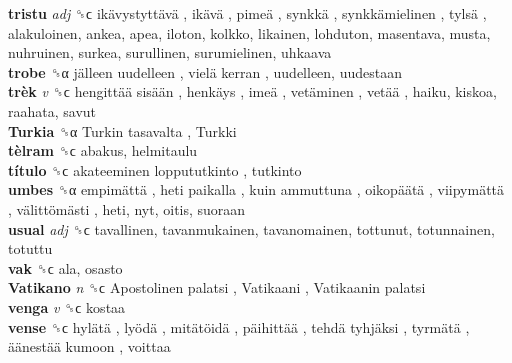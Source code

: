 \textbf{tristu} \emph{adj}  ␝ϲ   ikävystyttävä ,  ikävä ,  pimeä ,  synkkä ,  synkkämielinen ,  tylsä , alakuloinen, ankea, apea, iloton, kolkko, likainen, lohduton, masentava, musta, nuhruinen, surkea, surullinen, surumielinen, uhkaava  \\
\textbf{trobe} ␝α   jälleen uudelleen ,  vielä kerran , uudelleen, uudestaan  \\
\textbf{trèk} \emph{v}  ␝ϲ   hengittää sisään ,  henkäys ,  imeä ,  vetäminen ,  vetää , haiku, kiskoa, raahata, savut  \\
\textbf{Turkia} ␝α   Turkin tasavalta ,  Turkki   \\
\textbf{tèlram} ␝ϲ  abakus, helmitaulu  \\
\textbf{título} ␝ϲ   akateeminen loppututkinto , tutkinto  \\
\textbf{umbes} ␝α   empimättä ,  heti paikalla ,  kuin ammuttuna ,  oikopäätä ,  viipymättä ,  välittömästi , heti, nyt, oitis, suoraan  \\
\textbf{usual} \emph{adj}  ␝ϲ  tavallinen, tavanmukainen, tavanomainen, tottunut, totunnainen, totuttu  \\
\textbf{vak} ␝ϲ  ala, osasto  \\
\textbf{Vatikano} \emph{n}  ␝ϲ   Apostolinen palatsi ,  Vatikaani ,  Vatikaanin palatsi   \\
\textbf{venga} \emph{v}  ␝ϲ  kostaa  \\
\textbf{vense} ␝ϲ   hylätä ,  lyödä ,  mitätöidä ,  päihittää ,  tehdä tyhjäksi ,  tyrmätä ,  äänestää kumoon , voittaa  \\
